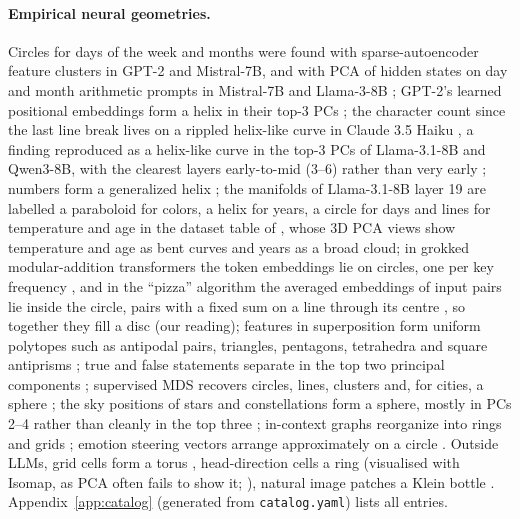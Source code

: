 \documentclass[10pt]{article}
\begin{document}
\paragraph{Empirical neural geometries.} Circles for days of the week and months were found with sparse-autoencoder feature clusters in GPT-2 and Mistral-7B, and with PCA of hidden states on day and month arithmetic prompts in Mistral-7B and Llama-3-8B \citep{engels2025notall}; GPT-2's learned positional embeddings form a helix in their top-3 PCs \citep{yedidia2023helix}; the character count since the last line break lives on a rippled helix-like curve in Claude 3.5 Haiku \citep{gurnee2025linebreaks}, a finding reproduced as a helix-like curve in the top-3 PCs of Llama-3.1-8B and Qwen3-8B, with the clearest layers early-to-mid (3--6) rather than very early \citep{sinii2026counting}; numbers form a generalized helix \citep{kantamneni2025trig}; the manifolds of Llama-3.1-8B layer 19 are labelled a paraboloid for colors, a helix for years, a circle for days and lines for temperature and age in the dataset table of \citet{bhalla2026sae}, whose 3D PCA views show temperature and age as bent curves and years as a broad cloud; in grokked modular-addition transformers the token embeddings lie on circles, one per key frequency \citep{nanda2023progress,zhong2023clock}, and in the ``pizza'' algorithm the averaged embeddings of input pairs lie inside the circle, pairs with a fixed sum on a line through its centre \citep{zhong2023clock}, so together they fill a disc (our reading); features in superposition form uniform polytopes such as antipodal pairs, triangles, pentagons, tetrahedra and square antiprisms \citep{elhage2022tms}; true and false statements separate in the top two principal components \citep{marks2024truth}; supervised MDS recovers circles, lines, clusters and, for cities, a sphere \citep{tiblias2025smds}; the sky positions of stars and constellations form a sphere, mostly in PCs 2--4 rather than cleanly in the top three \citep{berdnikov2026sky}; in-context graphs reorganize into rings and grids \citep{park2025iclr}; emotion steering vectors arrange approximately on a circle \citep{sun2026valence}. Outside LLMs, grid cells form a torus \citep{gardner2022torus}, head-direction cells a ring (visualised with Isomap, as PCA often fails to show it; \citealp{chaudhuri2019ring}), natural image patches a Klein bottle \citep{carlsson2008klein}. Appendix~\ref{app:catalog} (generated from \texttt{catalog.yaml}) lists all entries.
\end{document}
